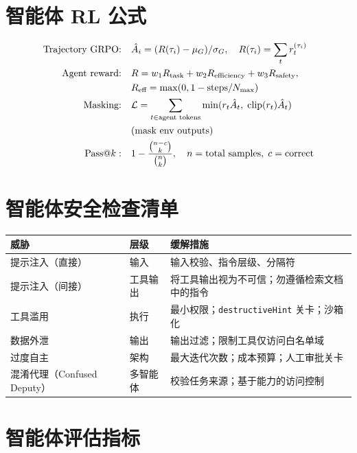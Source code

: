 \section{智能体 RL 公式}
\label{agentic-rl-formulas}

\begin{align}
\text{Trajectory GRPO:}&\quad \hat{A}_i = (R(\tau_i) - \mu_G)/\sigma_G, \quad R(\tau_i) = \sum_{t} r_t^{(\tau_i)} \\
\text{Agent reward:}&\quad R = w_1 R_\text{task} + w_2 R_\text{efficiency} + w_3 R_\text{safety}, \notag\\
&\quad R_\text{eff} = \max(0, 1 - \text{steps}/N_\text{max}) \\
\text{Masking:}&\quad \mathcal{L} = \sum_{t \in \text{agent tokens}} \min(r_t \hat{A}_t,\; \text{clip}(r_t) \hat{A}_t) \notag\\
&\quad \text{(mask env outputs)} \\
\text{Pass@}k:&\quad 1 - \frac{\binom{n-c}{k}}{\binom{n}{k}}, \quad n = \text{total samples},\; c = \text{correct}
\end{align}

\section{智能体安全检查清单}
\label{agent-security-checklist}

\noindent\begin{tabularx}{\linewidth}{@{}l Z{0.3} Z{1.7}@{}}
\toprule
\textbf{威胁} & \textbf{层级} & \textbf{缓解措施} \\
\midrule
提示注入（直接） & 输入 & 输入校验、指令层级、分隔符 \\
提示注入（间接） & 工具输出 & 将工具输出视为不可信；勿遵循检索文档中的指令 \\
工具滥用 & 执行 & 最小权限；\texttt{destructiveHint} 关卡；沙箱化 \\
数据外泄 & 输出 & 输出过滤；限制工具仅访问白名单域 \\
过度自主 & 架构 & 最大迭代次数；成本预算；人工审批关卡 \\
混淆代理（Confused Deputy） & 多智能体 & 校验任务来源；基于能力的访问控制 \\
\bottomrule
\end{tabularx}

\section{智能体评估指标}
\label{agent-evaluation-metrics}

